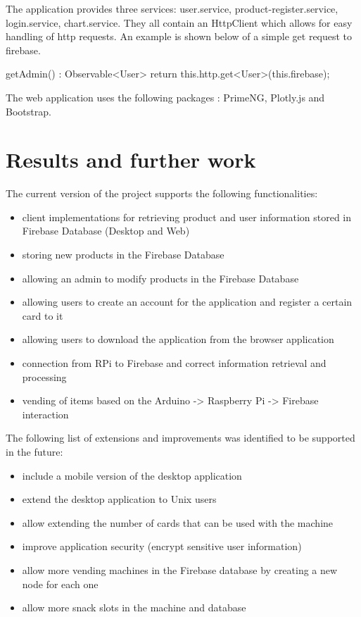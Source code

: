 \documentclass[a4paper,11pt]{article}
\begin{document}
The application provides three services: user.service, product-register.service, login.service, chart.service. They all contain an HttpClient
which allows for easy handling of http requests. An example is shown below of a simple get request to firebase.
\begin{python}
getAdmin() : Observable<User>{
    return this.http.get<User>(this.firebase);
  }
\end{python}

The web application uses the following packages : PrimeNG, Plotly.js and Bootstrap.

\section{Results and further work}

The current version of the project supports the following functionalities:
\begin{itemize}
\item client implementations for retrieving product and user information stored in Firebase Database (Desktop and Web)
\item storing new products in the Firebase Database
\item allowing an admin to modify products in the Firebase Database
\item allowing users to create an account for the application and register a certain card to it
\item allowing users to download the application from the browser application
\item connection from RPi to Firebase and correct information retrieval and processing
\item vending of items based on the Arduino -> Raspberry Pi -> Firebase interaction\\
\end{itemize}

The following list of extensions and improvements was identified to be supported in the future:
\begin{itemize}
\item include a mobile version of the desktop application
\item extend the desktop application to Unix users
\item allow extending the number of cards that can be used with the machine 
\item improve application security (encrypt sensitive user information)
\item allow more vending machines in the Firebase database by creating a new node for each one
\item allow more snack slots in the machine and database
\end{itemize}
\end{document}
